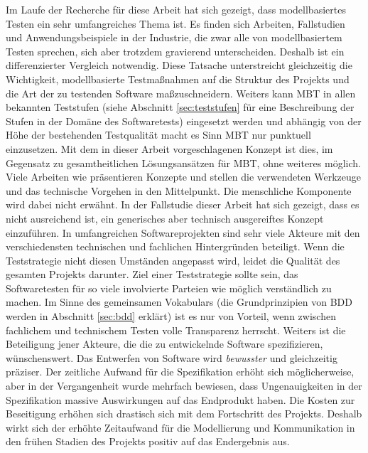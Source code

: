 Im Laufe der Recherche für diese Arbeit hat sich gezeigt, dass modellbasiertes Testen ein sehr umfangreiches Thema ist. Es finden sich Arbeiten, Fallstudien und Anwendungsbeispiele in der Industrie, die zwar alle von modellbasiertem Testen sprechen, sich aber trotzdem gravierend unterscheiden. Deshalb ist ein differenzierter Vergleich notwendig. Diese Tatsache unterstreicht gleichzeitig die Wichtigkeit, modellbasierte Testmaßnahmen auf die Struktur des Projekts und die Art der zu testenden Software maßzuschneidern. Weiters kann \Gls{MBT} in allen bekannten Teststufen (siehe Abschnitt \ref{sec:teststufen} für eine Beschreibung der Stufen in der Domäne des Softwaretests) eingesetzt werden und abhängig von der Höhe der bestehenden Testqualität macht es Sinn \Gls{MBT} nur punktuell einzusetzen. Mit dem in dieser Arbeit vorgeschlagenen Konzept ist dies, im Gegensatz zu gesamtheitlichen Lösungsansätzen für \Gls{MBT}, ohne weiteres möglich.\\
Viele Arbeiten wie \cite{pretschner_one_2005} \cite{pinheiro_model-based_2013} \cite{sensler_testautomatisierung_2011} präsentieren Konzepte und stellen die verwendeten Werkzeuge und das technische Vorgehen in den Mittelpunkt. Die menschliche Komponente wird dabei nicht erwähnt. In der Fallstudie dieser Arbeit hat sich gezeigt, dass es nicht ausreichend ist, ein generisches aber technisch ausgereiftes Konzept einzuführen. In umfangreichen Softwareprojekten sind sehr viele Akteure mit den verschiedensten technischen und fachlichen Hintergründen beteiligt. Wenn die Teststrategie nicht diesen Umständen angepasst wird, leidet die Qualität des gesamten Projekts darunter. Ziel einer Teststrategie sollte sein, das Softwaretesten für so viele involvierte Parteien wie möglich verständlich zu machen. Im Sinne des gemeinsamen Vokabulars (die Grundprinzipien von \Gls{BDD} werden in Abschnitt \ref{sec:bdd} erklärt) ist es nur von Vorteil, wenn zwischen fachlichem und technischem Testen volle Transparenz herrscht. Weiters ist die Beteiligung jener Akteure, die die zu entwickelnde Software spezifizieren, wünschenswert. Das Entwerfen von Software wird \textit{bewusster} und gleichzeitig präziser. Der zeitliche Aufwand für die Spezifikation erhöht sich möglicherweise, aber in der Vergangenheit wurde mehrfach bewiesen, dass Ungenauigkeiten in der Spezifikation massive Auswirkungen auf das Endprodukt haben. Die Kosten zur Beseitigung erhöhen sich drastisch sich mit dem Fortschritt des Projekts. Deshalb wirkt sich der erhöhte Zeitaufwand für die Modellierung und Kommunikation in den frühen Stadien des Projekts positiv auf das Endergebnis aus.\\

